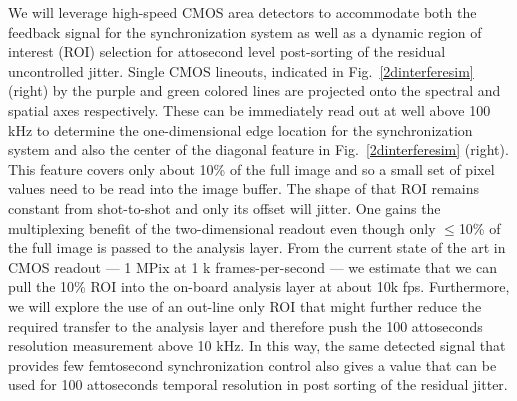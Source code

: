 \documentclass[letterpaper,oneside,11pt]{article}
\begin{document}
We will leverage high-speed CMOS area detectors to accommodate both the feedback signal for the synchronization system as well as a dynamic region of interest (ROI) selection for attosecond level post-sorting of the residual uncontrolled jitter.
Single CMOS lineouts, indicated in Fig.~\ref{2dinterferesim} (right) by the purple and green colored lines are projected onto the spectral and spatial axes respectively.
These can be immediately read out at well above 100 kHz \cite{cmosspeed} to determine the one-dimensional edge location for the synchronization system and also the center of the diagonal feature in Fig.~\ref{2dinterferesim} (right).
This feature covers only about 10\% of the full image and so a small set of pixel values need to be read into the image buffer. %
The shape of that ROI remains constant from shot-to-shot and only its offset will jitter. %
One gains the multiplexing benefit of the two-dimensional readout even though only $\leq$10\% of the full image is passed to the analysis layer. 
From the current state of the art in CMOS readout --- 1 MPix at 1 k frames-per-second \cite{cmosspeed} --- we estimate that we can pull the 10\% ROI into the on-board analysis layer at about 10k fps.
Furthermore, we will explore the use of an out-line only ROI that might further reduce the required transfer to the analysis layer and therefore push the 100 attoseconds resolution measurement above 10 kHz.
In this way, the same detected signal that provides few femtosecond synchronization control also gives a value that can be used for 100 attoseconds temporal resolution in post sorting of the residual jitter.
\end{document}
